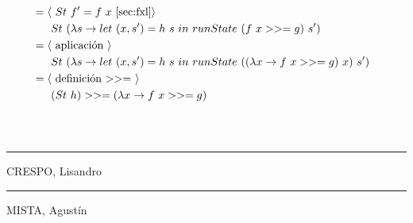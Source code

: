 \documentclass[a4paper,10pt]{article}
\begin{document}
\begin{align*}
  \\ &=\langle \text{ $St\ f' = f\ x$ \ref{sec:fxl}}\rangle
  \\ &\ \ \ \ \ St\ (\lambda s \rightarrow let\ (x,s')= h\ s\ in\ runState\ (f\ x >>= g)\ s')
  \\ &=\langle \text{ aplicación }\rangle
  \\ &\ \ \ \ \ St\ (\lambda s \rightarrow let\ (x,s')= h\ s\ in\ runState\ ((\lambda x\rightarrow f\ x >>= g)\ x)\ s')
  \\ &=\langle \text{ definición $>>=$ }\rangle
  \\ &\ \ \ \ \ (St\ h) >>= (\lambda x \rightarrow f\ x >>= g)
\end{align*}
	\\
	\pagebreak
\\
\vspace{\fill}
\begin{multicols}{2}
	\hrule
	\vspace{5pt}
	CRESPO, Lisandro \\
	\linebreak
	\hrule
	\vspace{5pt}
	MISTA, Agustín \\
\end{multicols}
\end{document}
